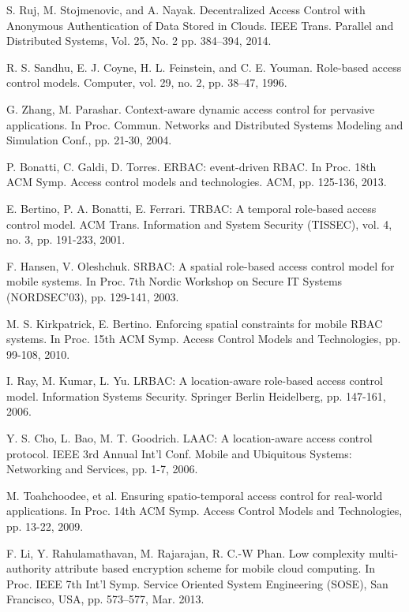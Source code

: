 \documentclass[10pt,journal]{IEEEtran}
\begin{document}
\begin{thebibliography}{5}
S. Ruj, M. Stojmenovic, and A. Nayak. Decentralized Access Control with Anonymous Authentication of Data Stored in Clouds. IEEE Trans. Parallel and Distributed Systems, Vol. 25, No. 2 pp. 384--394, 2014.

R. S. Sandhu, E. J. Coyne, H. L. Feinstein, and C. E. Youman. Role-based access control models. Computer, vol. 29, no. 2, pp. 38--47, 1996.




G. Zhang, M. Parashar. Context-aware dynamic access control for pervasive applications. In Proc. Commun. Networks and Distributed Systems Modeling and Simulation Conf., pp. 21-30, 2004.

P. Bonatti, C. Galdi, D. Torres. ERBAC: event-driven RBAC. In Proc. 18th ACM Symp. Access control models and technologies. ACM, pp. 125-136,  2013.

E. Bertino, P. A. Bonatti, E. Ferrari. TRBAC: A temporal role-based access control model. ACM Trans. Information and System Security (TISSEC), vol. 4, no. 3, pp. 191-233, 2001.

F. Hansen, V. Oleshchuk. SRBAC: A spatial role-based access control model for mobile systems. In Proc. 7th Nordic Workshop on Secure IT Systems (NORDSEC’03), pp. 129-141, 2003.

M. S. Kirkpatrick, E. Bertino. Enforcing spatial constraints for mobile RBAC systems. In Proc. 15th ACM Symp. Access Control Models and Technologies, pp. 99-108, 2010.

I. Ray, M. Kumar, L. Yu. LRBAC: A location-aware role-based access control model. Information Systems Security. Springer Berlin Heidelberg,  pp. 147-161, 2006.

Y. S. Cho, L. Bao, M. T. Goodrich. LAAC: A location-aware access control protocol. IEEE 3rd Annual Int'l Conf. Mobile and Ubiquitous Systems: Networking and Services, pp. 1-7, 2006.

M. Toahchoodee,  et al. Ensuring spatio-temporal access control for real-world applications. In Proc. 14th ACM Symp. Access Control Models and Technologies, pp. 13-22, 2009.

F. Li, Y. Rahulamathavan, M. Rajarajan, R. C.-W Phan. Low complexity multi-authority attribute based encryption scheme for mobile cloud computing. In Proc. IEEE 7th Int'l Symp. Service Oriented System Engineering (SOSE), San Francisco, USA, pp. 573--577, Mar. 2013.


\end{thebibliography}
\end{document}
